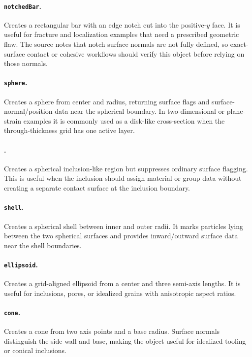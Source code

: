 \paragraph{\texttt{notchedBar}.}Creates a rectangular bar with an edge notch cut into the positive-$y$ face.  It is useful for fracture and localization examples that need a prescribed geometric flaw.  The source notes that notch surface normals are not fully defined, so exact-surface contact or cohesive workflows should verify this object before relying on those normals.

\paragraph{\texttt{sphere}.}Creates a sphere from center and radius, returning surface flags and surface-normal/position data near the spherical boundary.  In two-dimensional or plane-strain examples it is commonly used as a disk-like cross-section when the through-thickness grid has one active layer.

\paragraph{.}Creates a spherical inclusion-like region but suppresses ordinary surface flagging.  This is useful when the inclusion should assign material or group data without creating a separate contact surface at the inclusion boundary.

\paragraph{\texttt{shell}.}Creates a spherical shell between inner and outer radii.  It marks particles lying between the two spherical surfaces and provides inward/outward surface data near the shell boundaries.

\paragraph{\texttt{ellipsoid}.}Creates a grid-aligned ellipsoid from a center and three semi-axis lengths.  It is useful for inclusions, pores, or idealized grains with anisotropic aspect ratios.

\paragraph{\texttt{cone}.}Creates a cone from two axis points and a base radius.  Surface normals distinguish the side wall and base, making the object useful for idealized tooling or conical inclusions.

